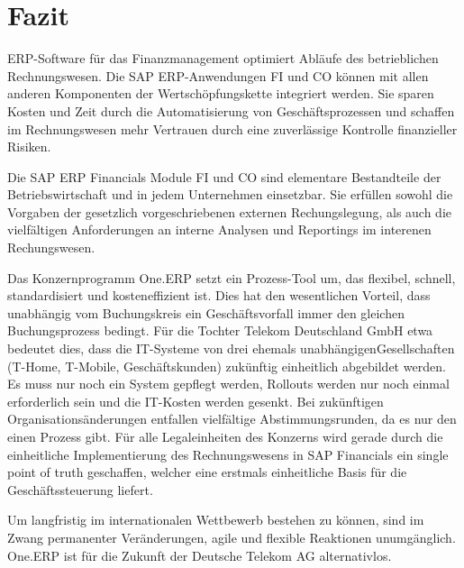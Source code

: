 \section{Fazit}
ERP-Software für das Finanzmanagement optimiert Abläufe des betrieblichen Rechnungswesen. Die SAP ERP-Anwendungen FI und CO können mit allen anderen Komponenten der Wertschöpfungskette integriert werden. Sie sparen Kosten und Zeit durch die Automatisierung von Geschäftsprozessen und schaffen im Rechnungswesen mehr Vertrauen durch eine zuverlässige Kontrolle finanzieller Risiken. 

Die SAP ERP Financials Module FI und CO sind elementare Bestandteile der Betriebswirtschaft und in jedem Unternehmen einsetzbar. Sie erfüllen sowohl die Vorgaben der gesetzlich vorgeschriebenen externen Rechungslegung, als auch die vielfältigen Anforderungen an interne Analysen und Reportings im interenen Rechungswesen. 

Das Konzernprogramm One.ERP setzt ein Prozess-Tool um, das flexibel, schnell, standardisiert und kosteneffizient ist. Dies hat den wesentlichen Vorteil, dass unabhängig vom Buchungskreis ein Geschäftsvorfall immer den gleichen Buchungsprozess bedingt. Für die Tochter Telekom Deutschland GmbH etwa bedeutet dies, dass die IT-Systeme von drei ehemals \glqq unabhängigen\grqq Gesellschaften (T-Home, T-Mobile, Geschäftskunden) zukünftig einheitlich abgebildet werden. Es muss nur noch ein System gepflegt werden, Rollouts werden nur noch einmal erforderlich sein und die IT-Kosten werden gesenkt. Bei zukünftigen Organisationsänderungen entfallen vielfältige Abstimmungsrunden, da es nur den einen Prozess gibt. Für alle Legaleinheiten des Konzerns wird gerade durch die einheitliche Implementierung des Rechnungswesens in SAP Financials ein single point of truth geschaffen, welcher eine erstmals einheitliche Basis für die Geschäftssteuerung liefert.

Um langfristig im internationalen Wettbewerb bestehen zu können, sind im Zwang permanenter Veränderungen, agile und flexible Reaktionen unumgänglich. One.ERP ist für die Zukunft der Deutsche Telekom AG alternativlos.